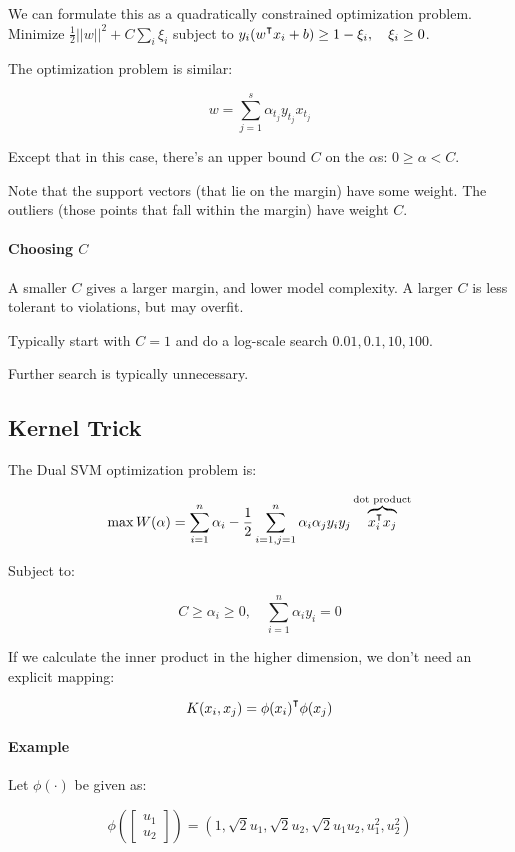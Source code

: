 \documentclass{idc_msc}
\renewcommand{\T}{{\mathpalette\raiseT\intercal}} %
\begin{document}
We can formulate this as a quadratically constrained optimization problem.
Minimize \(\frac{1}{2}||w||^2 + C \sum_i \xi_i\) subject to \(y_i(w^\T x_i + b) \ge 1 - \xi_i ,\quad \xi_i \ge 0\).

The optimization problem is similar:

\[w = \sum_{j=1}^s \alpha_{t_j} y_{t_j} x_{t_j}\]

Except that in this case, there's an upper bound \(C\) on the \(\alpha\)s: \(0 \ge \alpha < C\).

Note that the support vectors (that lie on the margin) have some weight.
The outliers (those points that fall within the margin) have weight \(C\).

\paragraph{Choosing \(C\)}

A smaller \(C\) gives a larger margin, and lower model complexity.
A larger \(C\) is less tolerant to violations, but may overfit.

Typically start with \(C=1\) and do a log-scale search \(0.01, 0.1, 10, 100\).

Further search is typically unnecessary.

\subsection{Kernel Trick}

The Dual SVM optimization problem is:

\[\max W(\alpha) = \sum_{i=1}^n \alpha_i - \frac{1}{2}\sum_{i=1,j=1}^n \alpha_i \alpha_j y_i y_j \overbrace{x_i^\T x_j}^{\text{dot product}}\]

Subject to:

\[C \ge \alpha_i \ge 0, \quad \sum_{i=1}^n \alpha_i y_i = 0\]

If we calculate the inner product in the higher dimension, we don't need an explicit mapping:

\[K(x_i, x_j) = \phi(x_i)^\T \phi(x_j)\]

\paragraph{Example}

Let \(\phi(\cdot)\) be given as:

\[
\phi\left(
\begin{bmatrix}
u_1 \\
u_2
\end{bmatrix}
\right) =
(1, \sqrt{2}u_1, \sqrt{2}u_2, \sqrt{2}u_1u_2, u_1^2, u_2^2)
\]
\end{document}

